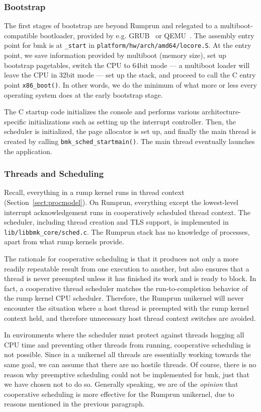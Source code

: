 \subsubsection*{Bootstrap}

The first stages of bootstrap are beyond Rumprun and relegated to a
multiboot-compatible bootloader, provided by e.g. GRUB~\cite{grub} or
QEMU~\cite{qemu}.  The assembly entry point for bmk is at \verb+_start+
in \texttt{platform/hw/arch/amd64/locore.S}.  At the entry point, we save
information provided by multiboot (\eg memory size), set up bootstrap
pagetables, switch the CPU to 64bit mode --- a multiboot loader will
leave the CPU in 32bit mode --- set up the stack, and proceed to call
the C entry point \verb+x86_boot()+.  In other words, we do the minimum
of what more or less every operating system does at the early bootstrap
stage.

The C startup code initializes the console and performs various
architecture-specific initializations such as setting up the interrupt
controller.  Then, the scheduler is initialized, the page allocator is
set up, and finally the main thread is created by calling
\verb+bmk_sched_startmain()+.  The main thread eventually launches the
application.


\subsubsection*{Threads and Scheduling}

Recall, everything in a rump kernel runs in thread context
(Section~\ref{sect:procmodel}).
On Rumprun, everything except the lowest-level interrupt acknowledgement
runs in cooperatively scheduled thread context.
The scheduler, including thread creation and TLS support, is implemented in
\verb+lib/libbmk_core/sched.c+.  The Rumprun stack has no knowledge
of processes, apart from what rump kernels provide.

The rationale for cooperative scheduling is that it produces not only a
more readily repeatable result from one execution to another, but also ensures
that a thread is never preempted unless it has finished its work and
is ready to block.  In fact, a cooperative thread scheduler matches the
run-to-completion behavior of the rump kernel CPU scheduler.  Therefore,
the Rumprun unikernel will never encounter the situation where a host thread
is preempted with the rump kernel context held, and therefore unnecessary
host thread context switches are avoided.

In environments where the scheduler must protect against threads hogging
all CPU time and preventing other threads from running, cooperative
scheduling is not possible.  Since in a unikernel all threads are
essentially working towards the same goal, we can assume that there are no
hostile threads.  Of course, there is no reason why preemptive scheduling
could not be implemented for bmk, just that we have chosen not to do so.
Generally speaking, we are of the \textit{opinion} that cooperative scheduling
is more effective for the Rumprun unikernel, due to reasons mentioned
in the previous paragraph.

